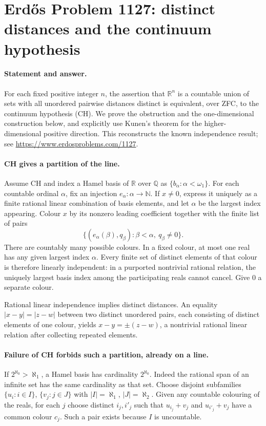 \section*{Erd\H{o}s Problem 1127: distinct distances and the continuum hypothesis}

\paragraph{Statement and answer.}
For each fixed positive integer \(n\), the assertion that \(\mathbb R^n\) is a countable union of sets with all unordered pairwise distances distinct is equivalent, over ZFC, to the continuum hypothesis (CH). We prove the obstruction and the one-dimensional construction below, and explicitly use Kunen's theorem for the higher-dimensional positive direction. This reconstructs the known independence result; see \url{https://www.erdosproblems.com/1127}.

\paragraph{CH gives a partition of the line.}
Assume CH and index a Hamel basis of \(\mathbb R\) over \(\mathbb Q\) as \(\{b_\alpha:\alpha<\omega_1\}\). For each countable ordinal \(\alpha\), fix an injection \(e_\alpha:\alpha\to\mathbb N\).
If \(x\ne0\), express it uniquely as a finite rational linear combination of basis elements, and let \(\alpha\) be the largest index appearing. Colour \(x\) by its nonzero leading coefficient together with the finite list of pairs
\[
 \{(e_\alpha(\beta),q_\beta):\beta<\alpha,\ q_\beta\ne0\}.
\]
There are countably many possible colours. In a fixed colour, at most one real has any given largest index \(\alpha\). Every finite set of distinct elements of that colour is therefore linearly independent: in a purported nontrivial rational relation, the uniquely largest basis index among the participating reals cannot cancel.
Give \(0\) a separate colour.

Rational linear independence implies distinct distances. An equality
\(|x-y|=|z-w|\) between two distinct unordered pairs, each consisting of distinct elements of one colour, yields \(x-y=\pm(z-w)\), a nontrivial rational linear relation after collecting repeated elements.

\paragraph{Failure of CH forbids such a partition, already on a line.}
If \(2^{\aleph_0}>\aleph_1\), a Hamel basis has cardinality \(2^{\aleph_0}\). Indeed the rational span of an infinite set has the same cardinality as that set. Choose disjoint subfamilies \(\{u_i:i\in I\}\), \(\{v_j:j\in J\}\) with \(|I|=\aleph_1\), \(|J|=\aleph_2\).
Given any countable colouring of the reals, for each \(j\) choose distinct \(i_j,i'_j\) such that \(u_{i_j}+v_j\) and \(u_{i'_j}+v_j\) have a common colour \(c_j\). Such a pair exists because \(I\) is uncountable.


